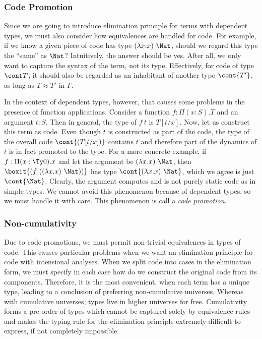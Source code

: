 \subsubsection{Code Promotion}

Since we are going to introduce elimination principle for terms with dependent types,
we must also consider how equivalences are handled for code. %
For example, if we know a given piece of code has type $(\lambda x. x)~\Nat$, should
we regard this type the ``same'' as $\Nat$? %
Intuitively, the answer should be yes. %
After all, we only want to capture the syntax of the term, not its type. %
Effectively, for code of type $\cont T$, it should also be regarded as an inhabitant
of another type $\cont{T'}$, as long as $T \approx T'$ in $\Gamma$. 

In the context of dependent types, however, that causes some problems in the presence
of function applications. %
Consider a function $f : \Pi(x : S). T$ and an argument $t : S$. %
Then in general, the type of $f~t$ is $T[t/x]$. %
Now, let us construct this term as code. %
Even though $t$ is constructed as part of the code, the type of the overall code
$\cont{(T[t/x])}$ contains $t$ and therefore part of the dynamics of $t$ is in fact
promoted to the type. %
For a more concrete example, if $f : \Pi(x : \Ty 0). x$ and let the argument be
$(\lambda x. x)~\Nat$, then $\boxit{(f~((\lambda x. x)~\Nat))}$ has type
$\cont{(\lambda x. x)~\Nat}$, which we agree is just $\cont{\Nat}$. %
Clearly, the argument computes and is not purely static code as in simple types. %
We cannot avoid this phenomenon because of dependent types, so we must handle it with
care. %
This phenomenon is call a \emph{code promotion}. 

\subsubsection{Non-cumulativity}

Due to code promotions, we must permit non-trivial equivalences in types of code. %
This causes particular problems when we want an elimination principle for code with
intensional analyses. %
When we split code into cases in the elimination form, we must specify in each case
how do we construct the original code from its components. %
Therefore, it is the most convenient, when each term has a unique type, leading to a
conclusion of preferring non-cumulative universes. %
Whereas with cumulative universes, types live in higher universes for free. %
Cumulativity forms a pre-order of types which cannot be captured solely by equivalence
rules and makes the typing rule for the elimination principle extremely difficult to express, if
not completely impossible.

